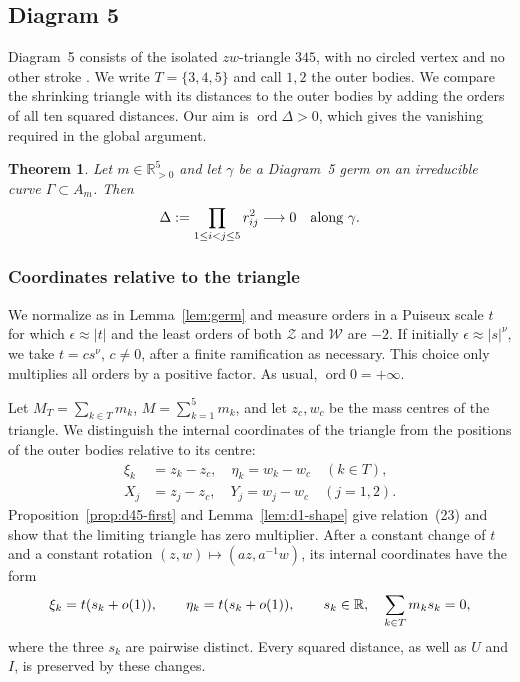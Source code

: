 \documentclass[Threeside,11pt]{article}
\newtheorem{theorem}{Theorem}[section]
\theoremstyle{definition}
\theoremstyle{remark}
\numberwithin{equation}{section}
\theoremstyle{remark}
\newcommand{\Rp}{\mathbb{R}_{>0}}
\newcommand{\ord}{\operatorname{ord}}
\begin{document}
{
\subsection{Diagram 5}\label{sec:d5}

Diagram~5 consists of the isolated $zw$-triangle $345$, with no circled vertex and no
other stroke \cite[\S7.4 and Fig.~11]{AK}.  We write $T=\{3,4,5\}$ and call $1,2$
the outer bodies.  We compare the shrinking triangle with its distances to the outer bodies by
adding the orders of all ten squared distances. Our aim is
$\ord\Delta>0$, which gives the vanishing required in the global argument.

\begin{theorem}\label{thm:d5}
Let $m\in\Rp^5$ and let $\gamma$ be a Diagram~5 germ on an irreducible curve
$\Gamma\subset A_m$.  Then
\[
 \Delta:=\prod_{1\le i<j\le5}r_{ij}^{2}\longrightarrow0
 \quad\hbox{along }\gamma.
\]
\end{theorem}

\subsubsection{Coordinates relative to the triangle}\label{d5-frame}
We normalize as in Lemma~\ref{lem:germ} and measure orders in a Puiseux scale $t$ for
which $\epsilon\approx|t|$ and the least orders of both $\mathcal Z$ and
$\mathcal W$ are $-2$.  If initially $\epsilon\approx|s|^\nu$, we take
$t=cs^\nu$, $c\ne0$, after a finite ramification as necessary.  This choice only
multiplies all orders by a positive factor.  As usual, $\ord0=+\infty$.

Let $M_T=\sum_{k\in T}m_k$, $M=\sum_{k=1}^5m_k$, and let $z_c,w_c$ be the
mass centres of the triangle.  We distinguish the internal coordinates of
the triangle from the positions of the outer bodies relative to its centre:
\[
 \begin{aligned}
 \xi_k&=z_k-z_c,\quad \eta_k=w_k-w_c\quad(k\in T),\\
 X_j&=z_j-z_c,\quad Y_j=w_j-w_c\quad(j=1,2).
 \end{aligned}
\]
Proposition~\ref{prop:d45-first} and Lemma~\ref{lem:d1-shape} give relation~(23)
and show that the limiting triangle has zero multiplier.  After a constant
change of $t$ and a constant rotation $(z,w)\mapsto(az,a^{-1}w)$, its internal
coordinates have the form
\begin{equation}\label{d5-eq-offsets}
 \xi_k=t(s_k+o(1)),\qquad \eta_k=t(s_k+o(1)),\qquad
 s_k\in\mathbb R,\quad \sum_{k\in T}m_ks_k=0,
\end{equation}
where the three $s_k$ are pairwise distinct.  Every squared distance, as well
as $U$ and $I$, is preserved by these changes.

}
\end{document}
